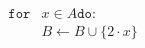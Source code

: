 \documentclass[preview]{standalone}
\begin{document}
\begin{align*}
\mathtt{for} &x \in A \mathtt{do}: \\&B \leftarrow B \cup \{2 \cdot x\}
\end{align*}
\end{document}
